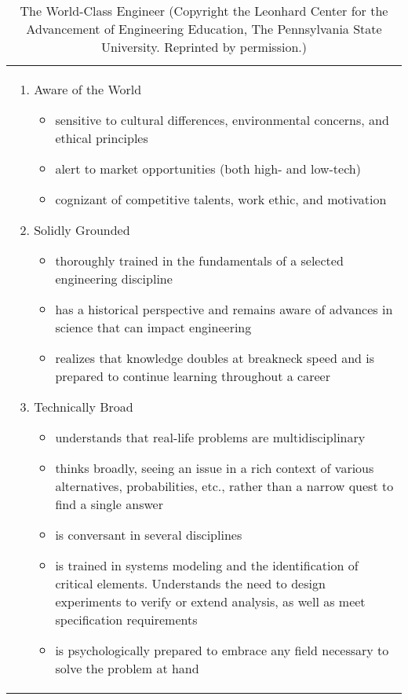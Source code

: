 \footnotesize
\begin{longtable}[c]{|m{18cm}|}
\caption{The World-Class Engineer (Copyright the Leonhard
Center for the Advancement of Engineering Education, The Pennsylvania
State University. Reprinted by permission.) 
\label{table:worldClassEngineer}}\\

\hline

\begin{enumerate}
\itemsep0em 
\def\labelenumi{\Roman{enumi})}

\item Aware of the World 
\begin{itemize}
\itemsep0em 
\item  sensitive to cultural differences, environmental concerns, and ethical  principles
\item  alert to market opportunities (both high- and low-tech)
\item  cognizant of competitive talents, work ethic, and motivation
\end{itemize}

\item Solidly Grounded
\begin{itemize}
\itemsep0em 
\item  thoroughly trained in the fundamentals of a selected engineering
  discipline
\item  has a historical perspective and remains aware of advances in science
  that can impact engineering
\item  realizes that knowledge doubles at breakneck speed and is prepared to
  continue learning throughout a career
\end{itemize}

\item Technically Broad
\begin{itemize}
\itemsep0em 
\item  understands that real-life problems are multidisciplinary
\item  thinks broadly, seeing an issue in a rich context of various
  alternatives, probabilities, etc., rather than a narrow quest to find
  a single answer
\item  is conversant in several disciplines
\item  is trained in systems modeling and the identification of critical
  elements. Understands the need to design experiments to verify or
  extend analysis, as well as meet specification requirements
\item  is psychologically prepared to embrace any field necessary to solve
  the problem at hand
\end{itemize}


\end{enumerate}
\end{longtable}
